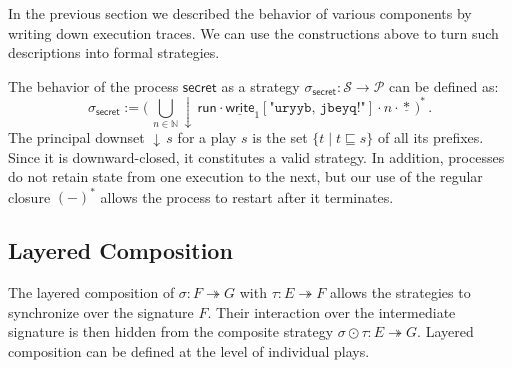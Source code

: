 \documentclass[acmsmall,screen,review,anonymous,nonacm]{acmart}
\newcommand{\kw}[1]{\ensuremath{ \mathsf{#1} }}
\begin{document}

In the previous section
we described the behavior of various components
by writing down execution traces.
We can use the constructions above to turn such descriptions
into formal strategies.

\begin{example} %
The behavior of the process $\kw{secret}$
as a strategy $\sigma_\kw{secret} : \mathcal{S} \rightarrow \mathcal{P}$
can be defined as:
\[
  \sigma_\kw{secret} :=
    \biggl( \,
      \bigcup_{n \in \mathbb{N}}
      {\downarrow} \,
      \kw{run} \cdot \underline{\kw{write}}_1[\texttt{"uryyb, jbeyq!"}]
               \cdot n \cdot \underline{*}
    \, \biggr)^*
  \,.
\]
The principal downset ${\downarrow}\, s$ for a play $s$
is the set $\{t \mid t \sqsubseteq s\}$ of all its prefixes.
Since it is downward-closed, it constitutes a valid strategy.
In addition,
processes do not retain state from one execution to the next,
but our use of the regular closure $(-)^*$
allows the process to restart after it terminates.
\end{example}


\subsection{Layered Composition}
\label{sec:strategy:lcomp}

The layered
composition of
$\sigma : F \twoheadrightarrow G$ with
$\tau : E \twoheadrightarrow F$
allows the strategies to synchronize
over the signature $F$.
Their interaction over the intermediate signature is then hidden from
the composite strategy $\sigma \odot \tau : E \twoheadrightarrow G$.
Layered composition can be defined
at the level of individual plays.
\end{document}
